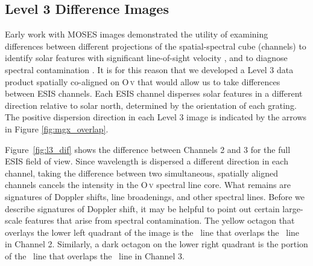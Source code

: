     \subsection{Level 3 Difference Images} \label{sec:dif_images} 
    	Early work with MOSES images demonstrated the utility of examining differences between different projections of the spatial-spectral cube (channels) to identify solar features with significant line-of-sight velocity \citep{Fox10,FoxPhD,RustPhD,Rust2019}, and to diagnose spectral contamination \citep{RustPhD, Rust2019}.
    	It is for this reason that we developed a Level 3 data product spatially co-aligned on O\,\textsc{v} %
    	that would allow us to take differences between ESIS channels.
    	Each ESIS channel disperses solar features in a different direction relative to solar north, determined by the orientation of each grating.
    	The positive dispersion direction in each Level 3 image is indicated by the arrows  in Figure \ref{fig:mgx_overlap}.
    	
    	Figure~\ref{fig:l3_dif} shows the difference between Channels 2 and 3 for the full ESIS field of view.  
    	Since wavelength is dispersed a different direction in each channel, taking the difference between two
    	simultaneous, spatially aligned channels cancels the intensity in the O\,\textsc{v} spectral line core. 
    	What remains are signatures of Doppler shifts, line broadenings, and other spectral lines.
    	Before we describe signatures of Doppler shift, it may be helpful to point out certain large-scale features that arise from spectral contamination.
    	The %
    	yellow octagon that overlays the lower left quadrant of the image is the \mgxbright \ line that overlaps the \ov \ line in Channel 2. Similarly, a dark octagon on the lower right quadrant is the portion of the \mgxbright \ line that overlaps the \ov \ line in Channel 3.
    	
